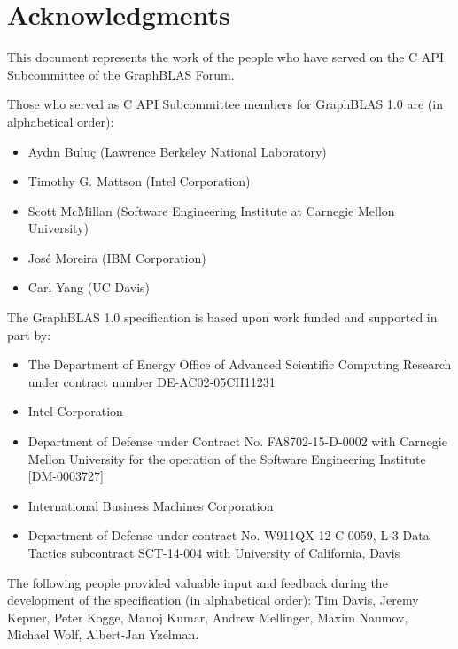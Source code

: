 \documentclass[11pt]{extbook}
\begin{document}

\vfill

\pagebreak
\tableofcontents
\vfill
\pagebreak


\section*{Acknowledgments}

This document represents the work of the people who have served on the C API
Subcommittee of the GraphBLAS Forum.

Those who served as C API Subcommittee members for GraphBLAS 1.0 are (in alphabetical order):
\begin{itemize}
\item Ayd\i n Bulu\c{c} (Lawrence Berkeley National Laboratory)
\item Timothy G. Mattson (Intel Corporation)
\item Scott McMillan (Software Engineering Institute at Carnegie Mellon University)
\item Jos\'e Moreira (IBM Corporation)
\item Carl Yang (UC Davis)
\end{itemize}


The GraphBLAS 1.0 specification is based upon work funded and supported in part by:
\begin{itemize}
\item The Department of Energy Office of Advanced Scientific Computing Research under contract number DE-AC02-05CH11231
\item Intel Corporation
\item Department of Defense under Contract No. FA8702-15-D-0002 with Carnegie Mellon University for the operation of the Software Engineering Institute [DM-0003727]
\item International Business Machines Corporation
\item Department of Defense under contract No. W911QX-12-C-0059, L-3 Data Tactics subcontract SCT-14-004 with University of California, Davis
\end{itemize}

The following people provided valuable input and feedback during the development of the specification (in alphabetical order):
Tim Davis, Jeremy Kepner, Peter Kogge, Manoj Kumar, Andrew Mellinger, Maxim Naumov, Michael Wolf, Albert-Jan Yzelman.
\vfill
\pagebreak
\end{document}
